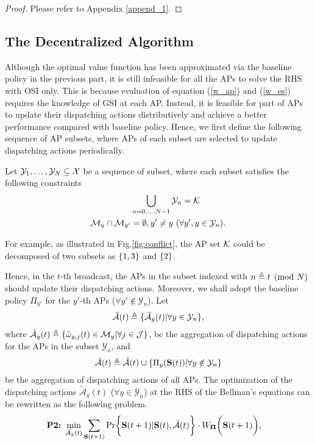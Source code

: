 \begin{proof}
    Please refer to Appendix \ref{append_1}.
\end{proof}

\subsection{The Decentralized Algorithm}
\label{subsec:ap_alg}
Although the optimal value function has been approximated via the baseline policy in the previous part, it is still infeasible for all the APs to solve the RHS with OSI only.
This is because evaluation of equation (\ref{w_ap}) and (\ref{w_es}) requires the knowledge of GSI at each AP.
Instead, it is feasible for part of APs to update their dispatching actions distributively and achieve a better performance compared with baseline policy.
Hence, we first define the following sequence of AP subsets, where APs of each subset are selected to update dispatching actions periodically.
\begin{definition}
    Let $\mathcal{Y}_{1}, \dots, \mathcal{Y}_{N} \subseteq \mathcal{X}$ be a sequence of subset, where each subset satisfies the following constraints
    \begin{align}
        &\bigcup_{n=0,\dots,N-1} \mathcal{Y}_{n} = \mathcal{K}
        \\
        \mathcal{M}_{y} \cap \mathcal{M}_{y'} &=\emptyset, y' \neq y~(\forall y',y \in \mathcal{Y}_{n}).
    \end{align}
\end{definition}
For example, as illustrated in Fig.\ref{fig:conflict}, the AP set $\mathcal{K}$ could be decomposed of two subsets as $\{1,3\}$ and $\{2\}$.

Hence, in the $t$-th broadcast, the APs in the subset indexed with $n \triangleq t \pmod{N}$ should update their dispatching actions.
Moreover, we shall adopt the baseline policy $\Pi_{y'}$ for the $y'$-th APs ($\forall y' \notin \mathcal{Y}_{n}$).
Let
\begin{align}
    \tilde{\mathcal{A}}(t) \triangleq \{\tilde{\mathcal{A}}_{y}(t) | \forall y\in\mathcal{Y}_{n}\},
\end{align}
where $\tilde{\mathcal{A}}_{y}(t) \triangleq \{ \tilde{\omega}_{y,j}(t)\in \mathcal{M}_{y}|\forall j\in\mathcal{J} \}$, 
be the aggregation of dispatching actions for the APs in the subset $\mathcal{Y}_{n}$, and
\begin{align}
    \bar{\mathcal{A}}(t) \triangleq \tilde{\mathcal{A}}(t) \cup \{\Pi_{y}(\mathbf{S}(t)) | \forall y\notin\mathcal{Y}_{n}\}
\end{align}
be the aggregation of dispatching actions of all APs.
The optimization of the dispatching actions $\tilde{\mathcal{A}}_{y}(t)$ ($\forall y\in\mathcal{Y}_{n}$) at the RHS of the Bellman's equations can be rewritten as the following problem.
{\small
\begin{align}
    \textbf{P2:}~
    \min_{ \tilde{\mathcal{A}}_{y}(t) }
    &\sum_{\Stat(t+1)} \Pr\Brace{
        \Stat(t+1) | \Stat(t), \bar{\mathcal{A}}(t)
    } \cdot W_{\Baseline}\Paren{\Stat(t+1)},
\end{align}
}

